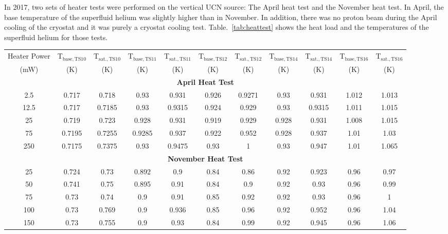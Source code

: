 In 2017, two sets of heater tests were performed on the vertical UCN
source: The April heat test and the November heat test. In April, the
base temperature of the superfluid helium was slightly higher than in
November. In addition, there was no proton beam during the April
cooling of the cryostat and it was purely a cryostat cooling
test. Table.~\ref{tab:heattest} shows the heat load and the
temperatures of the superfluid helium for those tests.

\begin{table}
  \begin{tabular}{|c|c|c|c|c|c|c|c|c|c|c|}
    \hline
    Heater Power & T$_{\mathrm{base, TS10}}$ &  T$_{\mathrm{sat., TS10}}$ & T$_{\mathrm{base, TS11}}$ &  T$_{\mathrm{sat., TS11}}$ & T$_{\mathrm{base, TS12}}$ &  T$_{\mathrm{sat., TS12}}$ & T$_{\mathrm{base, TS14}}$ &  T$_{\mathrm{sat., TS14}}$ & T$_{\mathrm{base, TS16}}$ &  T$_{\mathrm{sat., TS16}}$ \\
    (mW) & (K) & (K) & (K) & (K) & (K) & (K) & (K) & (K) & (K) & (K) \\
    \hline
    \hline
    \multicolumn{11}{|c|}{\textbf{April Heat Test}}\\
    \hline
   2.5 & 0.717 & 0.718 & 0.93 & 0.931 & 0.926 & 0.9271 & 0.93 & 0.931 & 1.012 & 1.013 \\
    \hline
    12.5 & 0.717 & 0.7185 & 0.93 &  0.9315 & 0.924 & 0.929 & 0.93 & 0.9315 & 1.011 & 1.015 \\
    \hline
    25 & 0.719 & 0.723 & 0.928 & 0.931 & 0.919 & 0.929 & 0.928 & 0.931 & 1.008 & 1.015 \\
    \hline
    75 & 0.7195 & 0.7255 & 0.9285 & 0.937 & 0.922 & 0.952 & 0.928 & 0.937 & 1.01 & 1.03 \\
    \hline
    250 & 0.7175 & 0.7375 & 0.93 & 0.9475 & 0.93 & 1 & 0.93 & 0.947 & 1.01 & 1.065 \\
    \hline
    \multicolumn{11}{|c|}{\textbf{November Heat Test}}\\
    \hline
   25 & 0.724 & 0.73 & 0.892 & 0.9 & 0.84 & 0.86 & 0.92 & 0.923 & 0.96 & 0.97 \\
    \hline
    50 & 0.741 & 0.75 & 0.895 & 0.91 & 0.84 & 0.9 & 0.92 & 0.93 & 0.96 & 0.99 \\
    \hline
    75 & 0.73 & 0.74 & 0.9 & 0.91 & 0.85 & 0.92 & 0.92 & 0.93 & 0.96 & 1 \\
    \hline
    100 & 0.73 & 0.769 & 0.9 & 0.936 & 0.85 & 0.96 & 0.92 & 0.952 & 0.96 & 1.04 \\
    \hline
    150 & 0.73 & 0.755 & 0.9 & 0.93 & 0.84 & 0.99 & 0.92 & 0.945 & 0.96 & 1.06 \\

\end{tabular}
\end{table}
